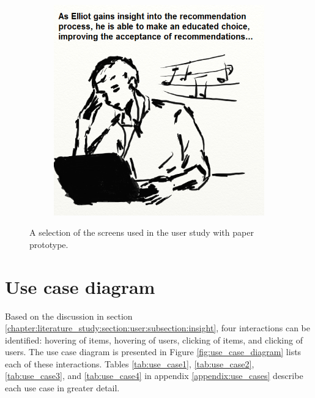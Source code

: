 \begin{figure}
\begin{subfigure}[t]{0.4\textwidth}
					\caption{}
					\label{figure:storyboard03}
	\end{subfigure}
	~
	\begin{subfigure}[t]{0.4\textwidth}
					\centering
					\includegraphics[width=\textwidth]{img/storyboard04}
					\caption{}
					\label{figure:storyboard04}
	\end{subfigure}
	\caption{A selection of the screens used in the user study with paper prototype.}%
	\label{figure:storyboard}%
\end{figure}




\section{Use case diagram}

Based on the discussion in section \ref{chapter:literature_study:section:user:subsection:insight}, four interactions can be identified: hovering of items, hovering of users, clicking of items, and clicking of users. The use case diagram is presented in Figure \ref{fig:use_case_diagram} lists each of these interactions. Tables \ref{tab:use_case1}, \ref{tab:use_case2}, \ref{tab:use_case3}, and \ref{tab:use_case4} in appendix \ref{appendix:use_cases} describe each use case in greater detail.

